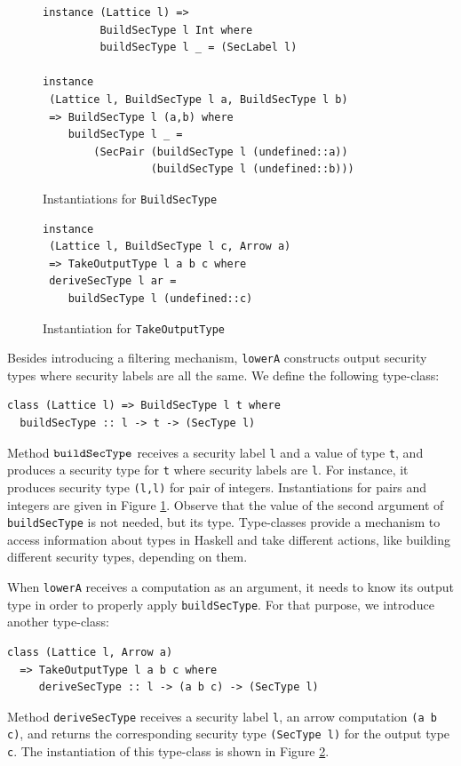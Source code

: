 \documentclass[times, 10pt,twocolumn]{article}
\begin{document}
\begin{figure}[t]
\begin{Verbatim}[fontsize=\footnotesize]
instance (Lattice l) => 
         BuildSecType l Int where
         buildSecType l _ = (SecLabel l)

instance 
 (Lattice l, BuildSecType l a, BuildSecType l b) 
 => BuildSecType l (a,b) where
    buildSecType l _ = 
        (SecPair (buildSecType l (undefined::a)) 
                 (buildSecType l (undefined::b)))
\end{Verbatim}
\caption{\label{fig:BuildSecType}Instantiations for \texttt{BuildSecType}}
\end{figure}
%
\begin{figure}[t]
\begin{Verbatim}[fontsize=\footnotesize]
instance 
 (Lattice l, BuildSecType l c, Arrow a) 
 => TakeOutputType l a b c where
 deriveSecType l ar = 
    buildSecType l (undefined::c)
\end{Verbatim}
\caption{\label{fig:TakeOutputType}Instantiation for \texttt{TakeOutputType}}
\end{figure}


Besides introducing a filtering mechanism, \texttt{lowerA} 
constructs output security types where security labels are all 
the same.
We define the following
type-class:
\begin{Verbatim}[fontsize=\footnotesize]
class (Lattice l) => BuildSecType l t where
  buildSecType :: l -> t -> (SecType l)
\end{Verbatim}

Method $\mathtt{buildSecType}$ receives a security label \texttt{l} and 
a value of type \texttt{t}, and produces a  
security type for \texttt{t} where security labels are \texttt{l}. 
For instance, it produces 
security type \texttt{(l,l)} for pair of integers. 
Instantiations for pairs and integers are given in Figure 
\ref{fig:BuildSecType}.  Observe that the value of 
the second argument of \texttt{buildSecType} is not needed, but its type. 
Type-classes provide a mechanism to access information 
about types in Haskell and take different actions, like building different
security types, depending on them.

When \texttt{lowerA} receives a computation as an argument, it 
needs to know its output type in order to properly apply
\texttt{buildSecType}. For that purpose, we introduce another type-class:
\begin{Verbatim}[fontsize=\footnotesize]
class (Lattice l, Arrow a) 
  => TakeOutputType l a b c where 
     deriveSecType :: l -> (a b c) -> (SecType l)
\end{Verbatim}
Method \texttt{deriveSecType} receives a security label \texttt{l},
an arrow computation \texttt{(a b c)}, and returns the corresponding 
security type \texttt{(SecType l)} for the output type
\texttt{c}. The instantiation of this type-class is shown in Figure 
\ref{fig:TakeOutputType}. 
\end{document}
